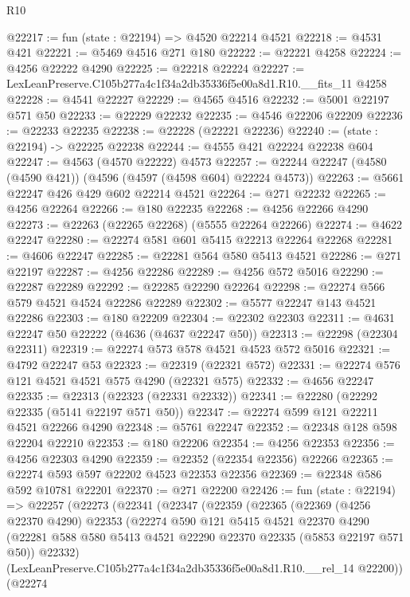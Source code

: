 \begin{lexlean}{R10}
\begin{coremodule}
@22217 := fun (state : @22194) => @4520 @22214 @4521
@22218 := @4531 @421
@22221 := @5469 @4516 @271 @180
@22222 := @22221 @4258
@22224 := @4256 @22222 @4290
@22225 := @22218 @22224
@22227 := LexLeanPreserve.C105b277a4c1f34a2db35336f5e00a8d1.R10.__fits_11 @4258
@22228 := @4541 @22227
@22229 := @4565 @4516
@22232 := @5001 @22197 @571 @50
@22233 := @22229 @22232
@22235 := @4546 @22206 @22209
@22236 := @22233 @22235
@22238 := @22228 (@22221 @22236)
@22240 := (state : @22194) -> @22225 @22238
@22244 := @4555 @421 @22224 @22238 @604
@22247 := @4563 (@4570 @22222) @4573
@22257 := @22244 @22247 (@4580 (@4590 @421)) (@4596 (@4597 (@4598 @604) @22224 @4573))
@22263 := @5661 @22247 @426 @429 @602 @22214 @4521
@22264 := @271 @22232
@22265 := @4256 @22264
@22266 := @180 @22235
@22268 := @4256 @22266 @4290
@22273 := @22263 (@22265 @22268) (@5555 @22264 @22266)
@22274 := @4622 @22247
@22280 := @22274 @581 @601 @5415 @22213 @22264 @22268
@22281 := @4606 @22247
@22285 := @22281 @564 @580 @5413 @4521
@22286 := @271 @22197
@22287 := @4256 @22286
@22289 := @4256 @572 @5016
@22290 := @22287 @22289
@22292 := @22285 @22290 @22264
@22298 := @22274 @566 @579 @4521 @4524 @22286 @22289
@22302 := @5577 @22247 @143 @4521 @22286
@22303 := @180 @22209
@22304 := @22302 @22303
@22311 := @4631 @22247 @50 @22222 (@4636 (@4637 @22247 @50))
@22313 := @22298 (@22304 @22311)
@22319 := @22274 @573 @578 @4521 @4523 @572 @5016
@22321 := @4792 @22247 @53
@22323 := @22319 (@22321 @572)
@22331 := @22274 @576 @121 @4521 @4521 @575 @4290 (@22321 @575)
@22332 := @4656 @22247
@22335 := @22313 (@22323 (@22331 @22332))
@22341 := @22280 (@22292 @22335 (@5141 @22197 @571 @50))
@22347 := @22274 @599 @121 @22211 @4521 @22266 @4290
@22348 := @5761 @22247
@22352 := @22348 @128 @598 @22204 @22210
@22353 := @180 @22206
@22354 := @4256 @22353
@22356 := @4256 @22303 @4290
@22359 := @22352 (@22354 @22356) @22266
@22365 := @22274 @593 @597 @22202 @4523 @22353 @22356
@22369 := @22348 @586 @592 @10781 @22201
@22370 := @271 @22200
@22426 := fun (state : @22194) =>
  @22257
    (@22273
      (@22341
        (@22347
          (@22359
            (@22365
              (@22369
                (@4256 @22370 @4290)
                @22353
                (@22274
                  @590
                  @121
                  @5415
                  @4521
                  @22370
                  @4290
                  (@22281 @588 @580 @5413 @4521 @22290 @22370 @22335 (@5853 @22197 @571 @50))
                  @22332)
                (LexLeanPreserve.C105b277a4c1f34a2db35336f5e00a8d1.R10.__rel_14 @22200))
              (@22274

\end{coremodule}
\end{lexlean}
